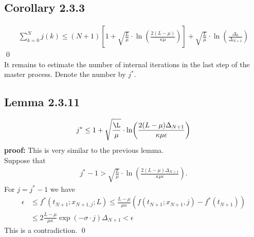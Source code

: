 \documentclass[12pt,a4paper]{article}
\begin{document}
	 \subsection*{Corollary 2.3.3}\label{cor233}
	 \begin{align*}
	 	\sum_{k=0}^{N}j(k) \leq (N+1)[1 + \sqrt{\frac{L}{\mu}}\cdot \ln(\frac{2(L - \mu)}{\kappa \mu})] + \sqrt{\frac{L}{\mu}}\cdot \ln(\frac{\Delta_0}{\Delta_{N+1}})
	 \end{align*}
	 \qed \\
	 It remains to estimate the number of internal iterations in the last step of the master process. Denote the number by $j^*$.
	 \subsection*{Lemma 2.3.11}\label{lem2311}
	 \begin{align*}
	 	j^* \leq 1 + \sqrt{\frac{\L}{\mu}}\cdot \ln(\frac{2(L - \mu)\Delta_{N+1}}{\kappa \mu \epsilon})
	 \end{align*}
	 \textbf{proof:} This is very similar to the previous lemma. \\
	 Suppose that
	 \begin{align*}
	 	j^* - 1 > \sqrt{\frac{L}{\mu}}\cdot \ln(\frac{2(L - \mu)\Delta_{N+1}}{\kappa \mu \epsilon}).
	 \end{align*}
	 For $j = j^* - 1$ we have
	 \begin{align*}
	 	\epsilon &\leq f^*(t_{N+1};x_{N+1,j};L) \leq \frac{L - \mu}{\mu \kappa}(f(t_{N+1};x_{N+1},j) - f^*(t_{N+1})) \\
	 	&\leq 2\frac{L - \mu}{\mu \kappa}\exp(-\sigma \cdot j)\Delta_{N+1} < \epsilon
	 \end{align*}
	 This is a contradiction. \qed 
\end{document}
